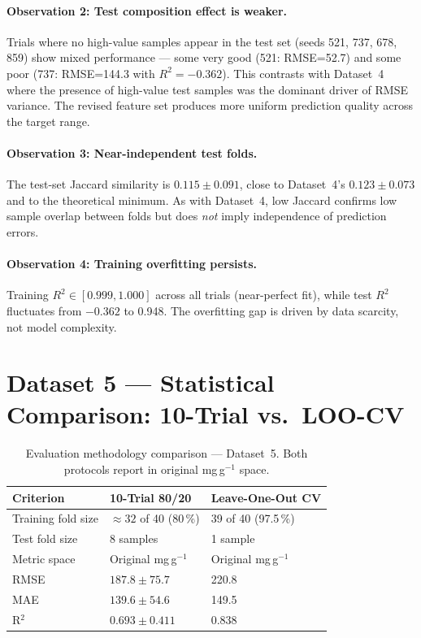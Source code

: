 \documentclass[12pt,a4paper]{article}
\begin{document}
\paragraph{Observation 2: Test composition effect is weaker.}
Trials where no high-value samples appear in the test set (seeds 521,
737, 678, 859) show mixed performance — some very good (521: RMSE=52.7)
and some poor (737: RMSE=144.3 with $R^2=-0.362$).  This contrasts
with Dataset~4 where the presence of high-value test samples was the
dominant driver of RMSE variance.  The revised feature set produces
more uniform prediction quality across the target range.

\paragraph{Observation 3: Near-independent test folds.}
The test-set Jaccard similarity is $0.115 \pm 0.091$, close to Dataset~4's
$0.123 \pm 0.073$ and to the theoretical minimum.  As with Dataset~4,
low Jaccard confirms low sample overlap between folds but does \emph{not}
imply independence of prediction errors.

\paragraph{Observation 4: Training overfitting persists.}
Training $R^2 \in [0.999, 1.000]$ across all trials (near-perfect fit),
while test $R^2$ fluctuates from $-0.362$
to 0.948.  The overfitting gap is driven by data scarcity, not model
complexity.

\section{Dataset 5 — Statistical Comparison: 10-Trial vs.\ LOO-CV}
\label{sec:ds5_eval_comparison}

\begin{table}[h]
\centering
\caption{Evaluation methodology comparison — Dataset~5.  Both protocols
  report in original mg\,g$^{-1}$ space.}
\label{tab:ds5_eval_comparison}
\small
\begin{tabular}{p{4cm}p{5.5cm}p{5.5cm}}
\toprule
Criterion & 10-Trial 80/20 & Leave-One-Out CV \\
\midrule
Training fold size  & $\approx 32$ of 40 (80\,\%)  & 39 of 40 (97.5\,\%) \\
Test fold size      & 8 samples                     & 1 sample \\
Metric space        & Original mg\,g$^{-1}$         & Original mg\,g$^{-1}$ \\
RMSE                & $187.8 \pm 75.7$              & 220.8 \\
MAE                 & $139.6 \pm 54.6$              & 149.5 \\
R$^2$               & $0.693 \pm 0.411$             & 0.838 \\
\bottomrule
\end{tabular}
\end{table}
\end{document}
